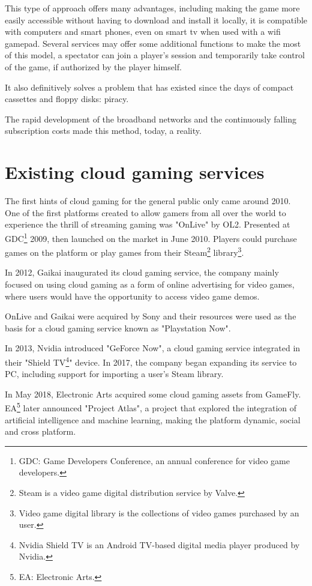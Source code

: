 This type of approach offers many advantages, including making the game more easily accessible without having to download and install it locally, it is compatible with computers and smart phones, even on smart tv when used with a wifi gamepad. Several services may offer some additional functions to make the most of this model, a spectator can join a player's session and temporarily take control of the game, if authorized by the player himself.

It also definitively solves a problem that has existed since the days of compact cassettes and floppy disks: piracy.

The rapid development of the broadband networks and the continuously falling subscription costs made this method, today, a reality.

\section{Existing cloud gaming services}
The first hints of cloud gaming for the general public only came around 2010. One of the first platforms created to allow gamers from all over the world to experience the thrill of streaming gaming was "OnLive" by OL2. Presented at GDC\footnote{GDC: Game Developers Conference, an annual conference for video game developers.} 2009, then launched on the market in June 2010. Players could purchase games on the platform or play games from their Steam\footnote{Steam is a video game digital distribution service by Valve.} library\footnote{Video game digital library is the collections of video games purchased by an user.}.

In 2012, Gaikai inaugurated its cloud gaming service, the company mainly focused on using cloud gaming as a form of online advertising for video games, where users would have the opportunity to access video game demos.

OnLive and Gaikai were acquired by Sony and their resources were used as the basis for a cloud gaming service known as "Playstation Now".

In 2013, Nvidia introduced "GeForce Now", a cloud gaming service integrated in their "Shield TV\footnote{Nvidia Shield TV is an Android TV-based digital media player produced by Nvidia.}" device. In 2017, the company began expanding its service to PC, including support for importing a user's Steam library.

In May 2018, Electronic Arts acquired some cloud gaming assets from GameFly. EA\footnote{EA: Electronic Arts.} later announced "Project Atlas", a project that explored the integration of artificial intelligence and machine learning, making the platform dynamic, social and cross platform.

